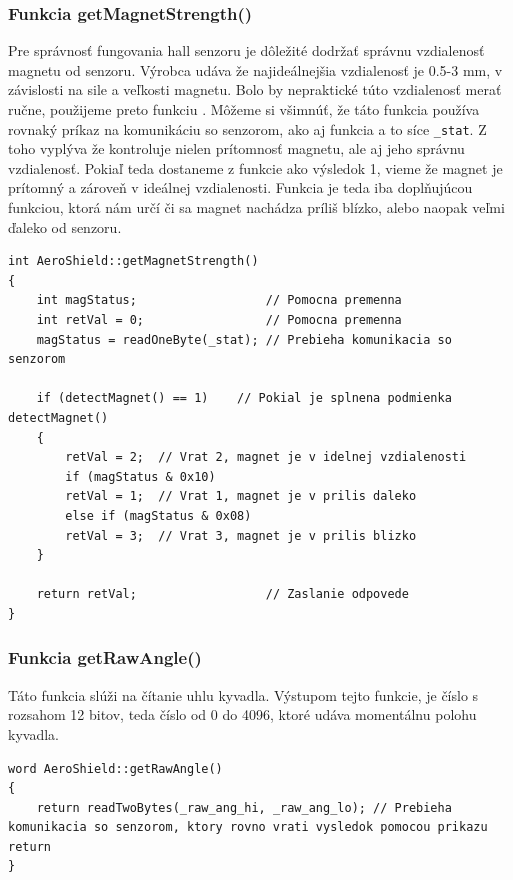 \subsubsection{Funkcia getMagnetStrength()}

Pre správnosť fungovania hall senzoru je dôležité dodržať správnu vzdialenosť magnetu od senzoru. Výrobca udáva že najideálnejšia vzdialenosť je 0.5-3 mm, v závislosti na sile a veľkosti magnetu. Bolo by nepraktické túto vzdialenosť merať ručne, použijeme preto funkciu . Môžeme si všimnúť, že táto funkcia používa rovnaký príkaz na komunikáciu so senzorom, ako aj funkcia  a to síce \verb|_stat|. Z toho vyplýva že  kontroluje nielen prítomnosť magnetu, ale aj jeho správnu vzdialenosť. Pokiaľ teda dostaneme z funkcie  ako výsledok 1, vieme že magnet je prítomný a zároveň v ideálnej vzdialenosti. Funkcia  je teda iba doplňujúcou funkciou, ktorá nám určí či sa magnet nachádza príliš blízko, alebo naopak veľmi ďaleko od senzoru. 

\begin{lstlisting}[caption={Zdrojový kód funkcie getMagnetStrength.},captionpos=b]
int AeroShield::getMagnetStrength()   
{
	int magStatus;                  // Pomocna premenna 
	int retVal = 0;                 // Pomocna premenna
	magStatus = readOneByte(_stat);	// Prebieha komunikacia so senzorom       
	
	if (detectMagnet() == 1)	// Pokial je splnena podmienka detectMagnet()
	{
		retVal = 2;  // Vrat 2, magnet je v idelnej vzdialenosti
		if (magStatus & 0x10)
		retVal = 1;  // Vrat 1, magnet je v prilis daleko
		else if (magStatus & 0x08)
		retVal = 3;  // Vrat 3, magnet je v prilis blizko
	}
	
	return retVal;                  // Zaslanie odpovede  
}
\end{lstlisting}

\subsubsection{Funkcia getRawAngle()}

Táto funkcia slúži na čítanie uhlu kyvadla. Výstupom tejto funkcie, je číslo s rozsahom 12 bitov, teda číslo od 0 do 4096, ktoré udáva momentálnu polohu kyvadla. 

\begin{lstlisting}[caption={Zdrojový kód funkcie getRawAngle.},captionpos=b]
word AeroShield::getRawAngle() 
{
	return readTwoBytes(_raw_ang_hi, _raw_ang_lo); // Prebieha komunikacia so senzorom, ktory rovno vrati vysledok pomocou prikazu return 
}
\end{lstlisting}

